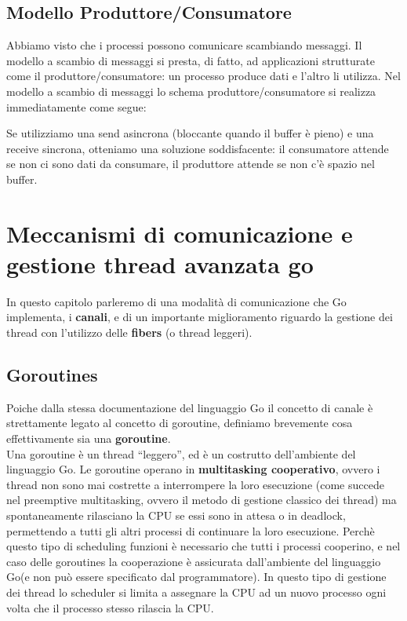\documentclass[10pt,a4paper,italian]{report}
\begin{document}
\section{Modello Produttore/Consumatore}
\noindent Abbiamo visto che i processi possono comunicare scambiando messaggi. Il modello a scambio di messaggi si presta, di fatto, ad applicazioni strutturate come il produttore/consumatore: un processo produce dati e l’altro li utilizza.
\newline \noindent Nel modello a scambio di messaggi lo schema produttore/consumatore si realizza immediatamente come segue:

\noindent Se utilizziamo una send asincrona (bloccante quando il buffer è pieno) e una receive sincrona, otteniamo una soluzione soddisfacente: il consumatore attende se non ci sono dati da consumare, il produttore attende se non c’è spazio nel buffer.

\chapter{Meccanismi di comunicazione e gestione thread avanzata go}
\noindent In questo capitolo parleremo di una modalità di comunicazione che Go implementa, i \textbf{canali}, e di un importante miglioramento riguardo la gestione dei thread con l'utilizzo delle \textbf{fibers} (o thread leggeri).

\section{Goroutines}
\noindent Poiche dalla stessa documentazione del linguaggio Go il concetto di canale è strettamente legato al concetto di goroutine, definiamo brevemente cosa effettivamente sia una \textbf{goroutine}.\\

\noindent Una goroutine è un thread ``leggero'', ed è un costrutto dell'ambiente del linguaggio Go. Le goroutine operano in \textbf{multitasking cooperativo}, ovvero i thread non sono mai costrette a interrompere la loro esecuzione (come succede nel preemptive multitasking, ovvero il metodo di gestione classico dei thread) ma spontaneamente rilasciano la CPU se essi sono in attesa o in deadlock, permettendo a tutti gli altri processi di continuare la loro esecuzione. Perchè questo tipo di scheduling funzioni è necessario che tutti i processi cooperino, e nel caso delle goroutines la cooperazione è assicurata dall'ambiente del linguaggio Go(e non può essere specificato dal programmatore). In questo tipo di gestione dei thread lo scheduler si limita a assegnare la CPU ad un nuovo processo ogni volta che il processo stesso rilascia la CPU. \\
\end{document}
